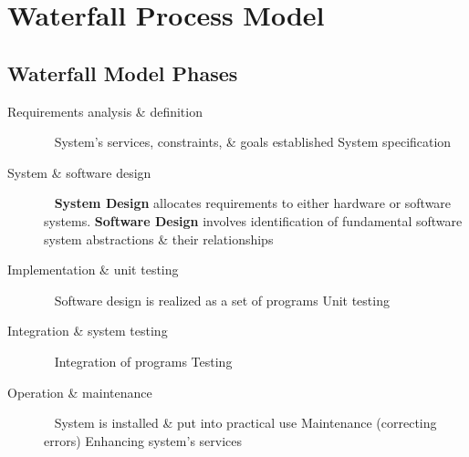 \documentclass{report}
\begin{document}
\section{Waterfall Process Model}
\begin{multicols}{2}
\subsection{Waterfall Model Phases} 
\begin{description}
  \item [Requirements analysis \& definition] \ \newline
  System’s services, constraints, \& goals established \newline
  System specification
  \item [System \& software design] \ \newline
  \textbf{System Design} allocates requirements to either hardware or software systems. \newline
  \textbf{Software Design} involves identification of fundamental software system abstractions \& their relationships
  \item [Implementation \& unit testing] \ \newline
  Software design is realized as a set of programs \newline
  Unit testing
  \item [Integration \& system testing] \ \newline
  Integration of programs \newline
  Testing
  \item [Operation \& maintenance] \ \newline
  System is installed \& put into practical use \newline
  Maintenance (correcting errors) \newline
  Enhancing system’s services
\end{description} \ \newline

\end{multicols}
\end{document}
